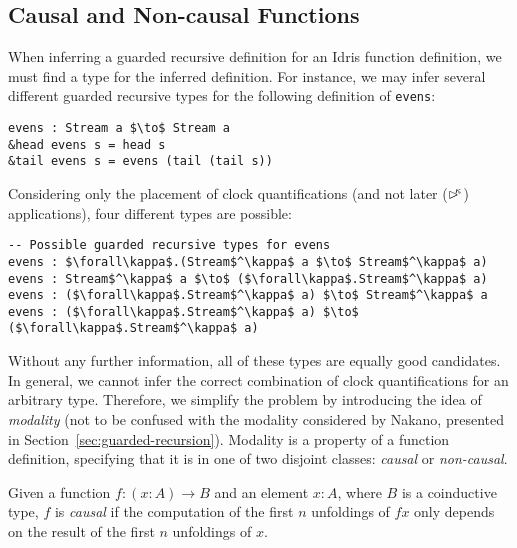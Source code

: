 \subsection{Causal and Non-causal Functions}
\label{sec:causal-non-causal}
When inferring a guarded recursive definition for an Idris function definition,
we must find a type for the inferred definition. For instance, we may infer
several different guarded recursive types for the following definition of \texttt{evens}:
\begin{lstlisting}[mathescape,title=\idrisBlock]
evens : Stream a $\to$ Stream a
&head evens s = head s 
&tail evens s = evens (tail (tail s))
\end{lstlisting}
Considering only the placement of clock quantifications (and not later
($\rhd^{\!\!\kappa}$) applications), four different types are possible:
\begin{lstlisting}[mathescape,title=\ttBlock]
-- Possible guarded recursive types for evens
evens : $\forall\kappa$.(Stream$^\kappa$ a $\to$ Stream$^\kappa$ a)
evens : Stream$^\kappa$ a $\to$ ($\forall\kappa$.Stream$^\kappa$ a)
evens : ($\forall\kappa$.Stream$^\kappa$ a) $\to$ Stream$^\kappa$ a
evens : ($\forall\kappa$.Stream$^\kappa$ a) $\to$ ($\forall\kappa$.Stream$^\kappa$ a)
\end{lstlisting}
Without any further information, all of these types are equally good
candidates. In general, we cannot infer the correct combination of clock
quantifications for an arbitrary type. Therefore, we simplify the problem by introducing
the idea of \emph{modality} (not to be confused with the modality considered by
Nakano, presented in Section~\ref{sec:guarded-recursion}). Modality is a property of a function definition,
specifying that it is in one of two disjoint classes: \emph{causal} or
\emph{non-causal}. 

\begin{definition}
\label{def:causality}
  Given a function $f : (x : A) \to B$ and an element $x : A$, where $B$ is a
  coinductive type, $f$ is \emph{causal} if the computation of the first $n$
  unfoldings of $f x$ only depends on the result of the first $n$ unfoldings of $x$.
\end{definition}

